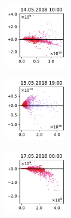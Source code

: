 \begin{figure}[H]
    \centering
    \begin{subfigure}
        \centering
        \includegraphics[width=0.30\textwidth,valign=t]{evaluation/figures/perturbations/perturbation-14.05.2018:10.00-aerosols-div-1.01.pdf}
    \end{subfigure}
    \begin{subfigure}
        \centering
        \includegraphics[width=0.30\textwidth,valign=t]{evaluation/figures/perturbations/perturbation-15.05.2018:19.00-aerosols-div-1.01.pdf}
    \end{subfigure}
    \begin{subfigure}
        \centering
        \includegraphics[width=0.30\textwidth,valign=t]{evaluation/figures/perturbations/perturbation-17.05.2018:00.00-aerosols-div-1.01.pdf}
    \end{subfigure}


\end{figure}
